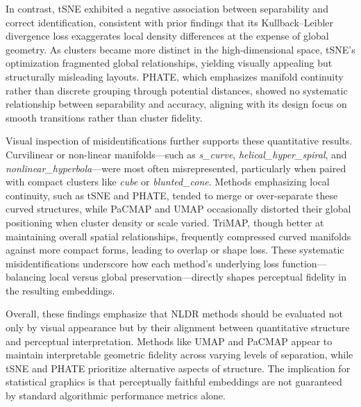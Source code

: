 \documentclass[
  11pt,
  a4paper,
]{report}
\begin{document}
In contrast, tSNE exhibited a negative association between separability
and correct identification, consistent with prior findings that its
Kullback--Leibler divergence loss exaggerates local density differences
at the expense of global geometry. As clusters became more distinct in
the high-dimensional space, tSNE's optimization fragmented global
relationships, yielding visually appealing but structurally misleading
layouts. PHATE, which emphasizes manifold continuity rather than
discrete grouping through potential distances, showed no systematic
relationship between separability and accuracy, aligning with its design
focus on smooth transitions rather than cluster fidelity.

Visual inspection of misidentifications further supports these
quantitative results. Curvilinear or non-linear manifolds---such as
\emph{s\_curve}, \emph{helical\_hyper\_spiral}, and
\emph{nonlinear\_hyperbola}---were most often misrepresented,
particularly when paired with compact clusters like \emph{cube} or
\emph{blunted\_cone}. Methods emphasizing local continuity, such as tSNE
and PHATE, tended to merge or over-separate these curved structures,
while PaCMAP and UMAP occasionally distorted their global positioning
when cluster density or scale varied. TriMAP, though better at
maintaining overall spatial relationships, frequently compressed curved
manifolds against more compact forms, leading to overlap or shape loss.
These systematic misidentifications underscore how each method's
underlying loss function---balancing local versus global
preservation---directly shapes perceptual fidelity in the resulting
embeddings.

Overall, these findings emphasize that NLDR methods should be evaluated
not only by visual appearance but by their alignment between
quantitative structure and perceptual interpretation. Methods like UMAP
and PaCMAP appear to maintain interpretable geometric fidelity across
varying levels of separation, while tSNE and PHATE prioritize
alternative aspects of structure. The implication for statistical
graphics is that perceptually faithful embeddings are not guaranteed by
standard algorithmic performance metrics alone.
\end{document}
